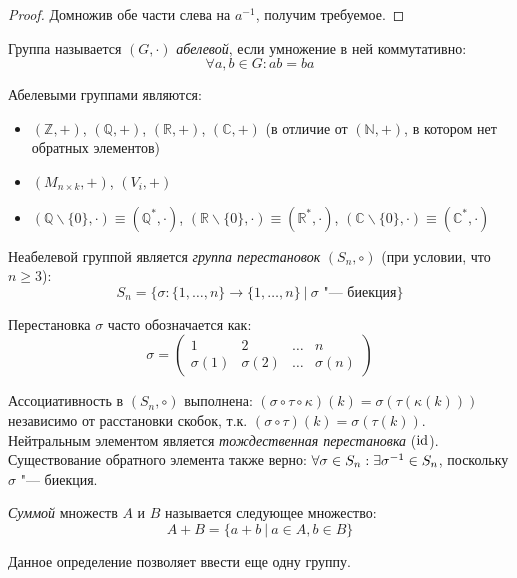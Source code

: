 \begin{proof}
	Домножив обе части слева на $a^{-1}$, получим требуемое.
\end{proof}

\begin{definition}
	Группа называется $(G, \cdot)$ \textit{абелевой}, если умножение в ней коммутативно:
	\[\forall a, b \in G: ab = ba\]
\end{definition}

\begin{example}
	Абелевыми группами являются:
	\begin{itemize}
		\item $(\mathbb{Z}, +)$, $(\mathbb{Q}, +)$, $(\mathbb{R}, +)$, $(\mathbb{C}, +)$ (в отличие от $(\mathbb{N}, +)$, в котором нет обратных элементов)
		\item $(M_{n \times k}, +)$, $(V_i, +)$
		\item $(\mathbb{Q} \backslash \{0\}, \cdot) \equiv (\mathbb{Q}^*, \cdot)$, $(\mathbb{R} \backslash \{0\}, \cdot) \equiv (\mathbb{R}^*, \cdot)$, $(\mathbb{C} \backslash \{0\}, \cdot) \equiv (\mathbb{C}^*, \cdot)$
	\end{itemize}
\end{example}

\begin{example}
	Неабелевой группой является \textit{группа перестановок} $(S_n, \circ)$ (при условии, что $n \ge 3$):
	\[S_n = \{\sigma: \{1,\dots, n\} \rightarrow \{1,\dots, n\}~|~\sigma \text{ "--- биекция}\}\]
	
	Перестановка $\sigma$ часто обозначается как:
	\[\sigma = \begin{pmatrix}
	1&2&\dots&n\\
	\sigma(1)&\sigma(2)&\dots&\sigma(n)
	\end{pmatrix}\]
	
	Ассоциативность в $(S_n, \circ)$ выполнена: $(\sigma \circ \tau \circ \kappa) (k) = \sigma(\tau(\kappa(k)))$ независимо от расстановки скобок, т.\:к. $(\sigma \circ \tau)(k) = \sigma(\tau(k))$. Нейтральным элементом является \textit{тождественная перестановка} ($\mathrm{id}$). Существование обратного элемента также верно: $\forall \sigma \hm{\in} S_n: \exists \sigma^{-1} \hm{\in} S_n$, поскольку $\sigma$ "--- биекция.
\end{example}

\begin{definition}
	\textit{Суммой} множеств $A$ и $B$ называется следующее множество:
	\[A + B = \{a + b~|~a \in A, b \in B\}\]
	
	Данное определение позволяет ввести еще одну группу.
\end{definition}

